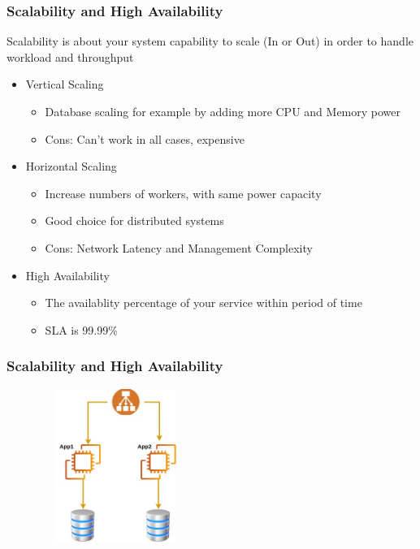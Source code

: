 \documentclass{beamer}
\begin{document}
	
	\begin{frame}
		\frametitle{Scalability and High Availability}
		Scalability is about your system capability to scale (In or Out) in order to handle workload and throughput
		\begin{itemize}
			\item<2-> Vertical Scaling
				\begin{itemize} 
					\item<3-> \scriptsize{Database scaling for example by adding more CPU and Memory power} 
					\item<4-> \scriptsize{Cons: \alert {Can't work in all cases, expensive} }
				\end{itemize}
			\item<5-> Horizontal Scaling
				\begin{itemize} 
					\item<6-> \scriptsize{Increase numbers of workers, with same power capacity} 
					\item<7-> \scriptsize{Good choice for distributed systems}
					\item<8-> \scriptsize{Cons: \alert {Network Latency and Management Complexity} }
				\end{itemize}
		
			\item<9-> High Availability
			\begin{itemize} 
				\item<10-> \scriptsize{The availablity percentage of your service within period of time} 
				\item<11-> \scriptsize{SLA is 99.99\%}
			\end{itemize}
		
		\end{itemize}
		\vspace{100mm}
	\end{frame}


	\begin{frame}
		\frametitle{Scalability and High Availability}
		\begin{figure}[h]
			\includegraphics[width=50mm, height=50mm, scale=1]{img/Scalability-1.jpg}
		\end{figure}	
	\end{frame}
\end{document}

